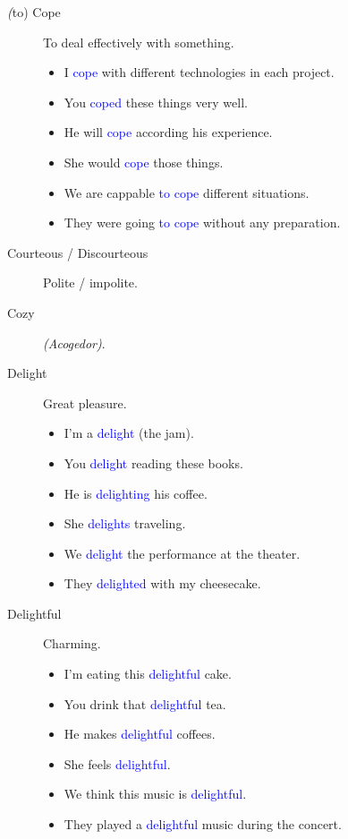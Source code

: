 \begin{multicols}{2}
\begin{description}
\item[\emph(to) Cope] To deal effectively with something.
\begin{itemize}
\item I \textcolor{blue}{cope} with different technologies in each project.
\item You \textcolor{blue}{coped} these things very well.
\item He will \textcolor{blue}{cope} according his experience.
\item She would \textcolor{blue}{cope} those things.
\item We are cappable \textcolor{blue}{to cope} different situations.
\item They were going \textcolor{blue}{to cope} without any preparation.
\end{itemize}

\item[Courteous / Discourteous] Polite / impolite.

\item[Cozy] \emph{(Acogedor)}.

\item[Delight] Great pleasure.
\begin{itemize}
\item I'm a \textcolor{blue}{delight} (the jam).
\item You \textcolor{blue}{delight} reading these books.
\item He is \textcolor{blue}{delighting} his coffee.
\item She \textcolor{blue}{delights} traveling.
\item We \textcolor{blue}{delight} the performance at the theater.
\item They \textcolor{blue}{delighted} with my cheesecake.
\end{itemize}

\item[Delightful] Charming.
\begin{itemize}
\item I'm eating this \textcolor{blue}{delightful} cake.
\item You drink that \textcolor{blue}{delightful} tea.
\item He makes \textcolor{blue}{delightful} coffees.
\item She feels \textcolor{blue}{delightful}.
\item We think this music is \textcolor{blue}{delightful}.
\item They played a \textcolor{blue}{delightful} music during the concert.
\end{itemize}


\end{description}
\end{multicols}
